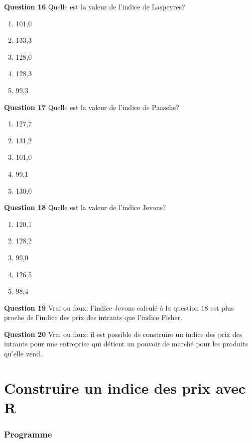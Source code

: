 \documentclass[]{article}
\begin{document}
\textbf{Question 16} Quelle est la valeur de l'indice de Laspeyres?

\begin{enumerate}
\def\labelenumi{\alph{enumi})}
\item
  101,0
\item
  133,3
\item
  128,0
\item
  128,3
\item
  99,3
\end{enumerate}

\textbf{Question 17} Quelle est la valeur de l'indice de Paasche?

\begin{enumerate}
\def\labelenumi{\alph{enumi})}
\item
  127,7
\item
  131,2
\item
  101,0
\item
  99,1
\item
  130,0
\end{enumerate}

\textbf{Question 18} Quelle est la valeur de l'indice Jevons?

\begin{enumerate}
\def\labelenumi{\alph{enumi})}
\item
  120,1
\item
  128,2
\item
  99,0
\item
  126,5
\item
  98,4
\end{enumerate}

\textbf{Question 19} Vrai ou faux: l'indice Jevons calculé à la question 18 est plus proche de l'indice des prix des intrants que l'indice Fisher.

\textbf{Question 20} Vrai ou faux: il est possible de construire un indice des prix des intrants pour une entreprise qui détient un pouvoir de marché pour les produits qu'elle vend.

\hypertarget{part-construire-un-indice-des-prix-avec-r}{%
\part{Construire un indice des prix avec R}\label{part-construire-un-indice-des-prix-avec-r}}

\hypertarget{programme-2}{%
\section{Programme}\label{programme-2}}
\end{document}
